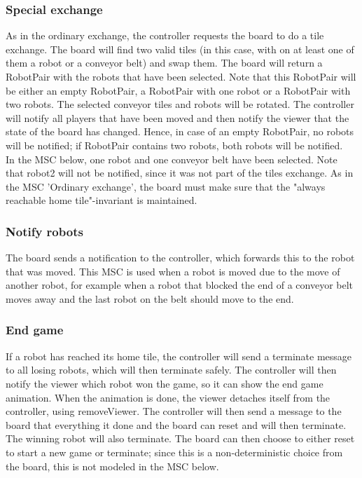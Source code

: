 	\subsubsection{Special exchange}
	\begin{minipage}{\linewidth}
		As in the ordinary exchange, the controller requests the board to do a tile exchange. The board will find two valid tiles (in this case, with on at least one of them a robot or a conveyor belt) and swap them. The board will return a RobotPair with the robots that have been selected. Note that this RobotPair will be either an empty RobotPair, a RobotPair with one robot or a RobotPair with two robots. The selected conveyor tiles and robots will be rotated. The controller will notify all players that have been moved and then notify the viewer that the state of the board has changed. Hence, in case of an empty RobotPair, no robots will be notified; if RobotPair contains two robots, both robots will be notified. \\
In the MSC below, one robot and one conveyor belt have been selected. Note that robot2 will not be notified, since it was not part of the tiles exchange. As in the MSC 'Ordinary exchange', the board must make sure that the "always reachable home tile"-invariant is maintained.

		
	\end{minipage}	

	\subsubsection{Notify robots}
	\begin{minipage}{\linewidth}
		The board sends a notification to the controller, which forwards this to the robot that was moved. This MSC is used when a robot is moved due to the move of another robot, for example when a robot that blocked the end of a conveyor belt moves away and the last robot on the belt should move to the end.

		
	\end{minipage}

	\subsubsection{End game}
	\begin{minipage}{\linewidth}
		If a robot has reached its home tile, the controller will send a terminate message to all losing robots, which will then terminate safely. The controller will then notify the viewer which robot won the game, so it can show the end game animation. When the animation is done, the viewer detaches itself from the controller, using removeViewer. The controller will then send a message to the board that everything it done and the board can reset and will then terminate. The winning robot will also terminate. The board can then choose to either reset to start a new game or terminate; since this is a non-deterministic choice from the board, this is not modeled in the MSC below.

		
	\end{minipage}
